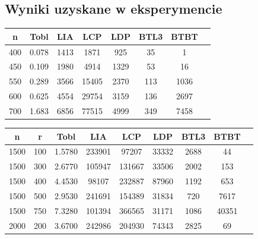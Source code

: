 \documentclass[10pt,a4paper]{article}
\begin{document}
\subsection{Wyniki uzyskane w eksperymencie}
\begin{center}
    \begin{tabular}{ |c|c|c|c|c|c|c|c| }
        \hline
        n & Tobl & LIA & LCP & LDP & BTL3 & BTBT \\
        \hline
        400	& 0.078	& 1413 & 1871 & 925 & 35 & 1\\
        \hline
        450	& 0.109 & 1980 & 4914 &	1329 & 53 &	16\\
        \hline
        550	& 0.289 & 3566 & 15405 & 2370 &	113	& 1036\\
        \hline
        600 & 0.625 & 4554 & 29754 & 3159 &	136 & 2697\\
        \hline
        700	& 1.683 & 6856 & 77515 & 4999 & 349	& 7458\\
        \hline
    \end{tabular}
\end{center}

\begin{center}
    \begin{tabular}{ |c|c|c|c|c|c|c|c|c| }
        \hline
        n & r & Tobl & LIA & LCP & LDP & BTL3 & BTBT \\
        \hline
        1500 & 100 & 1.5780 & 233901 & 97207 & 33332 & 2688 & 44\\
        \hline
        1500 & 300 & 2.6770 & 105947 & 131667 &	33506 & 2002 & 153\\
        \hline
        1500 & 400 & 4.4530 & 98107 & 232887 & 87960 & 1192 & 653\\
        \hline
        1500 & 500 & 2.9530 & 241691 & 154389 &	31834 & 720 & 7617\\
        \hline
        1500 & 750 & 7.3280 & 101394 & 366565 &	31171 & 1086 & 40351\\
        \hline
        2000 & 200 & 3.6700 & 242986 & 204930 &	74343 & 2825 & 69\\
        \hline
    \end{tabular}
\end{center}
\end{document}
